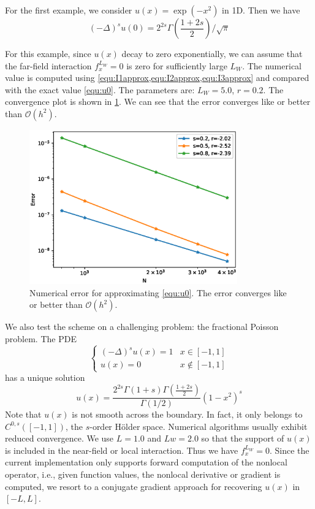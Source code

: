 \documentclass[10pt,a4paper]{article}
\theoremstyle{definition}
\begin{document}
For the first example, we consider $u(x)=\exp(-x^2)$ in 1D. Then we have
\begin{equation}\label{equ:u0}
	(-\Delta)^s u(0) = 2^{2s}\Gamma\left( \frac{1+2s}{2} \right)/\sqrt{\pi}
\end{equation}

For this example, since $u(x)$ decay to zero exponentially, we can assume that the far-field interaction $f^{L_W}_x=0$ is zero for sufficiently large $L_W$. The numerical value is computed using \cref{equ:I1approx,equ:I2approx,equ:I3approx} and compared with the exact value \cref{equ:u0}. The parameters are: $L_W=5.0$, $r=0.2$. The convergence plot is shown in \cref{fig:fig5}. We can see that the error converges like or better than $\mathcal{O}(h^2)$. 

\begin{figure}[H] %
\centering
\includegraphics[width=0.8\textwidth,keepaspectratio]{figures/fig5}
\caption{Numerical error for approximating \cref{equ:u0}. The error converges like or better than $\mathcal{O}(h^2)$.}
\label{fig:fig5}
\end{figure}

We also test the scheme on a challenging problem: the fractional Poisson problem. The PDE
\begin{equation}
	\begin{cases}
		(-\Delta)^s u(x) = 1 & x\in [-1,1]\\
		u(x) = 0 & x\not\in [-1,1]
	\end{cases}
\end{equation}
has a unique solution
\begin{equation}
	u(x) = \frac{2^{2s}\Gamma(1+s)\Gamma\left( \frac{1+2s}{2} \right) }{\Gamma(1/2)} (1-x^2)^s
\end{equation}
Note that $u(x)$ is not smooth across the boundary. In fact, it only belongs to $C^{0,s}([-1,1])$, the $s$-order H\"older space. Numerical algorithms usually exhibit reduced convergence.  We use $L=1.0$ and $Lw=2.0$ so that the support of $u(x)$ is included in the near-field or local interaction. Thus we have $f_x^{L_W}=0$. Since the current implementation only supports forward computation of the nonlocal operator, i.e., given function values, the nonlocal derivative or gradient is computed, we resort to a conjugate gradient approach for recovering $u(x)$ in $[-L,L]$. 
\end{document}
